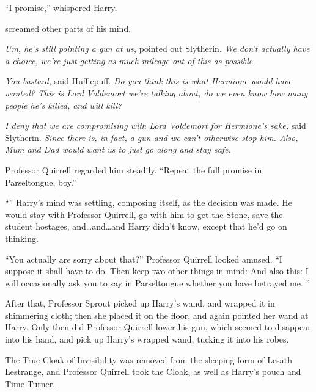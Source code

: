 “I promise,” whispered Harry.

\emph{} screamed other parts of his mind.

\emph{Um, he’s still pointing a gun at us,} pointed out Slytherin. \emph{We don’t actually have a choice, we’re just getting as much mileage out of this as possible.}

\emph{You bastard,} said Hufflepuff. \emph{Do you think this is what Hermione would have wanted? This is Lord Voldemort we’re talking about, do we even know how many people he’s killed, and will kill?}

\emph{I deny that we are compromising with Lord Voldemort for Hermione’s sake,} said Slytherin. \emph{Since there is, in fact, a gun and we can’t otherwise stop him. Also, Mum and Dad would want us to just go along and stay safe.}

Professor Quirrell regarded him steadily. “Repeat the full promise in Parseltongue, boy.”

“” Harry’s mind was settling, composing itself, as the decision was made. He would stay with Professor Quirrell, go with him to get the Stone, save the student hostages, and…and…and Harry didn’t know, except that he’d go on thinking.

“You actually are sorry about that?” Professor Quirrell looked amused. “I suppose it shall have to do. Then keep two other things in mind:  And also this: I will occasionally ask you to say in Parseltongue whether you have betrayed me. ”

\later

After that, Professor Sprout picked up Harry’s wand, and wrapped it in shimmering cloth; then she placed it on the floor, and again pointed her wand at Harry. Only then did Professor Quirrell lower his gun, which seemed to disappear into his hand, and pick up Harry’s wrapped wand, tucking it into his robes.

The True Cloak of Invisibility was removed from the sleeping form of Lesath Lestrange, and Professor Quirrell took the Cloak, as well as Harry’s pouch and Time-Turner.

